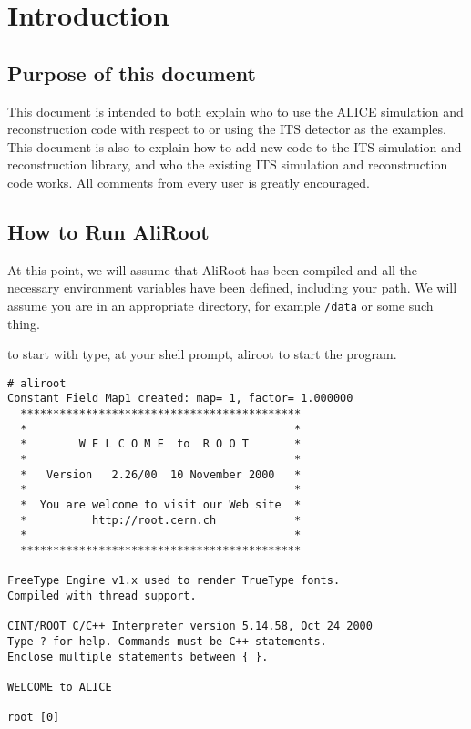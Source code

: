 \chapter*{Introduction}
\section*{Purpose of this document}

This document is intended to both explain who to use the ALICE simulation and
reconstruction code with respect to or using the ITS detector as the
examples. This document is also to explain how to add new code to the ITS
simulation and reconstruction library, and who the existing ITS simulation and
reconstruction code works. All comments from every user is greatly encouraged.

\section*{How to Run AliRoot}

At this point, we will assume that AliRoot has been compiled and all the
necessary environment variables have been defined, including your path. We will
assume you are in an appropriate directory, for example \texttt{/data} or some
such thing.

to start with type, at your shell prompt, aliroot to start the program.

\scriptsize
\begin{verbatim}
# aliroot
Constant Field Map1 created: map= 1, factor= 1.000000
  *******************************************
  *                                         *
  *        W E L C O M E  to  R O O T       *
  *                                         *
  *   Version   2.26/00  10 November 2000   *
  *                                         *
  *  You are welcome to visit our Web site  *
  *          http://root.cern.ch            *
  *                                         *
  *******************************************

FreeType Engine v1.x used to render TrueType fonts.
Compiled with thread support.

CINT/ROOT C/C++ Interpreter version 5.14.58, Oct 24 2000
Type ? for help. Commands must be C++ statements.
Enclose multiple statements between { }.

WELCOME to ALICE

root [0]
\end{verbatim}
\normalsize

